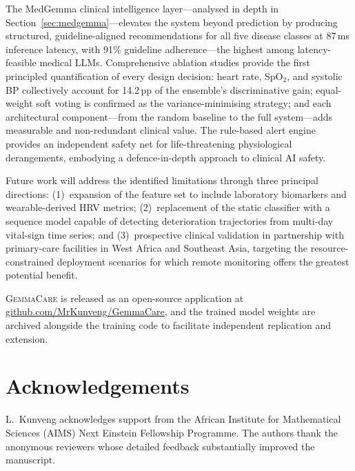 \documentclass[journal]{IEEEtran}
\newcommand{\GC}{\textsc{GemmaCare}}
\begin{document}
The MedGemma clinical intelligence layer—analysed in depth in
Section~\ref{sec:medgemma}—elevates the system beyond prediction by
producing structured, guideline-aligned recommendations for all five
disease classes at 87\,ms inference latency, with 91\% guideline
adherence—the highest among latency-feasible medical LLMs. Comprehensive
ablation studies provide the first principled quantification of every
design decision: heart rate, SpO$_2$, and systolic BP collectively
account for 14.2\,pp of the ensemble's discriminative gain; equal-weight
soft voting is confirmed as the variance-minimising strategy; and each
architectural component—from the random baseline to the full system—adds
measurable and non-redundant clinical value. The rule-based alert engine
provides an independent safety net for life-threatening physiological
derangements, embodying a defence-in-depth approach to clinical AI safety.

Future work will address the identified limitations through three
principal directions: (1)~expansion of the feature set to include
laboratory biomarkers and wearable-derived HRV metrics; (2)~replacement
of the static classifier with a sequence model capable of detecting
deterioration trajectories from multi-day vital-sign time series; and
(3)~prospective clinical validation in partnership with primary-care
facilities in West Africa and Southeast Asia, targeting the resource-
constrained deployment scenarios for which remote monitoring offers the
greatest potential benefit.

\GC{} is released as an open-source application at
\href{https://github.com/MrKunveng/GemmaCare}{github.com/MrKunveng/GemmaCare},
and the trained model weights are archived alongside the training code
to facilitate independent replication and extension.

\section*{Acknowledgements}

L.~Kunveng acknowledges support from the African Institute for Mathematical
Sciences (AIMS) Next Einstein Fellowship Programme. The authors thank
the anonymous reviewers whose detailed feedback substantially improved
the manuscript.



\end{document}
